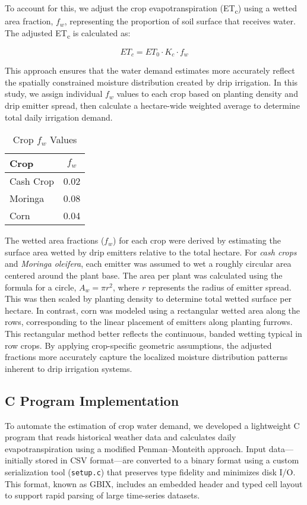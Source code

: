 \documentclass[twocolumn]{article}
\begin{document}
To account for this, we adjust the crop evapotranspiration (ET\textsubscript{c}) using a wetted area fraction, \( f_w \), representing the proportion of soil surface that receives water. The adjusted ET\textsubscript{c} is calculated as:

\[
ET_c = ET_0 \cdot K_c \cdot f_w
\]

This approach ensures that the water demand estimates more accurately reflect the spatially constrained moisture distribution created by drip irrigation. In this study, we assign individual \( f_w \) values to each crop based on planting density and drip emitter spread, then calculate a hectare-wide weighted average to determine total daily irrigation demand.

\begin{table}[h]
\centering
\caption{Crop \( f_w \) Values}
\label{tab:fw-results}
\begin{tabular}{lc}
\toprule
\textbf{Crop} & \textbf{\( f_w \)} \\
\midrule
Cash Crop & 0.02 \\
Moringa & 0.08 \\
Corn & 0.04 \\
\bottomrule
\end{tabular}
\end{table}

The wetted area fractions (\( f_w \)) for each crop were derived by estimating the surface area wetted by drip emitters relative to the total hectare. For \textit{cash crops} and \textit{Moringa oleifera}, each emitter was assumed to wet a roughly circular area centered around the plant base. The area per plant was calculated using the formula for a circle, \( A_w = \pi r^2 \), where \( r \) represents the radius of emitter spread. This was then scaled by planting density to determine total wetted surface per hectare. In contrast, corn was modeled using a rectangular wetted area along the rows, corresponding to the linear placement of emitters along planting furrows. This rectangular method better reflects the continuous, banded wetting typical in row crops. By applying crop-specific geometric assumptions, the adjusted fractions more accurately capture the localized moisture distribution patterns inherent to drip irrigation systems.

\subsection{C Program Implementation}

To automate the estimation of crop water demand, we developed a lightweight C program that reads historical weather data and calculates daily evapotranspiration using a modified Penman–Monteith approach. Input data—initially stored in CSV format—are converted to a binary format using a custom serialization tool (\texttt{setup.c}) that preserves type fidelity and minimizes disk I/O. This format, known as GBIX, includes an embedded header and typed cell layout to support rapid parsing of large time-series datasets.
\end{document}

